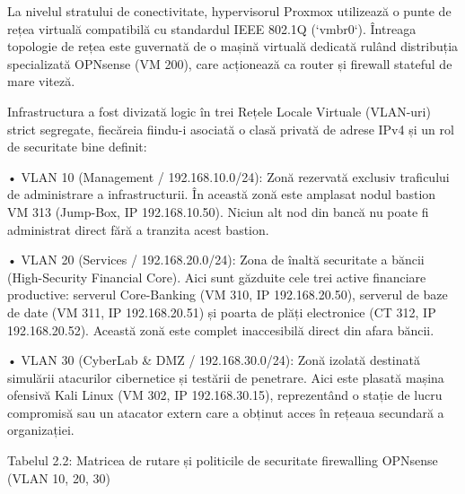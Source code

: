 La nivelul stratului de conectivitate, hypervisorul Proxmox utilizează o punte de rețea virtuală compatibilă cu standardul IEEE 802.1Q (`vmbr0`). Întreaga topologie de rețea este guvernată de o mașină virtuală dedicată rulând distribuția specializată OPNsense (VM 200), care acționează ca router și firewall stateful de mare viteză.

Infrastructura a fost divizată logic în trei Rețele Locale Virtuale (VLAN-uri) strict segregate, fiecăreia fiindu-i asociată o clasă privată de adrese IPv4 și un rol de securitate bine definit:

• VLAN 10 (Management / 192.168.10.0/24): Zonă rezervată exclusiv traficului de administrare a infrastructurii. În această zonă este amplasat nodul bastion VM 313 (Jump-Box, IP 192.168.10.50). Niciun alt nod din bancă nu poate fi administrat direct fără a tranzita acest bastion.

• VLAN 20 (Services / 192.168.20.0/24): Zona de înaltă securitate a băncii (High-Security Financial Core). Aici sunt găzduite cele trei active financiare productive: serverul Core-Banking (VM 310, IP 192.168.20.50), serverul de baze de date (VM 311, IP 192.168.20.51) și poarta de plăți electronice (CT 312, IP 192.168.20.52). Această zonă este complet inaccesibilă direct din afara băncii.

• VLAN 30 (CyberLab \& DMZ / 192.168.30.0/24): Zonă izolată destinată simulării atacurilor cibernetice și testării de penetrare. Aici este plasată mașina ofensivă Kali Linux (VM 302, IP 192.168.30.15), reprezentând o stație de lucru compromisă sau un atacator extern care a obținut acces în rețeaua secundară a organizației.

Tabelul 2.2: Matricea de rutare și politicile de securitate firewalling OPNsense (VLAN 10, 20, 30)

